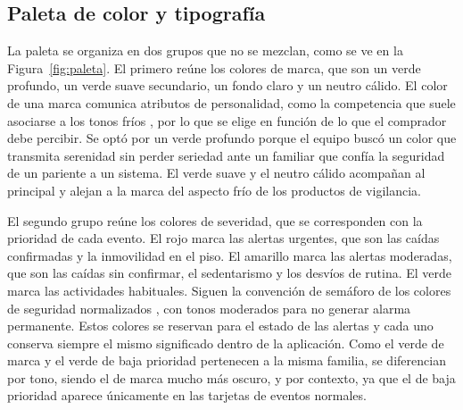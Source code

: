 


\subsection{Paleta de color y tipografía}
\label{sec:branding-paleta}

La paleta se organiza en dos grupos que no se mezclan, como se ve en la Figura~\ref{fig:paleta}.
El primero reúne los colores de marca, que son un verde profundo, un verde suave secundario, un fondo claro y un neutro cálido.
El color de una marca comunica atributos de personalidad, como la competencia que suele asociarse a los tonos fríos \parencite{Labrecque2012}, por lo que se elige en función de lo que el comprador debe percibir.
Se optó por un verde profundo porque el equipo buscó un color que transmita serenidad sin perder seriedad ante un familiar que confía la seguridad de un pariente a un sistema.
El verde suave y el neutro cálido acompañan al principal y alejan a la marca del aspecto frío de los productos de vigilancia.

El segundo grupo reúne los colores de severidad, que se corresponden con la prioridad de cada evento.
El rojo marca las alertas urgentes, que son las caídas confirmadas y la inmovilidad en el piso.
El amarillo marca las alertas moderadas, que son las caídas sin confirmar, el sedentarismo y los desvíos de rutina.
El verde marca las actividades habituales.
Siguen la convención de semáforo de los colores de seguridad normalizados \parencite{ISO3864}, con tonos moderados para no generar alarma permanente.
Estos colores se reservan para el estado de las alertas y cada uno conserva siempre el mismo significado dentro de la aplicación.
Como el verde de marca y el verde de baja prioridad pertenecen a la misma familia, se diferencian por tono, siendo el de marca mucho más oscuro, y por contexto, ya que el de baja prioridad aparece únicamente en las tarjetas de eventos normales.

